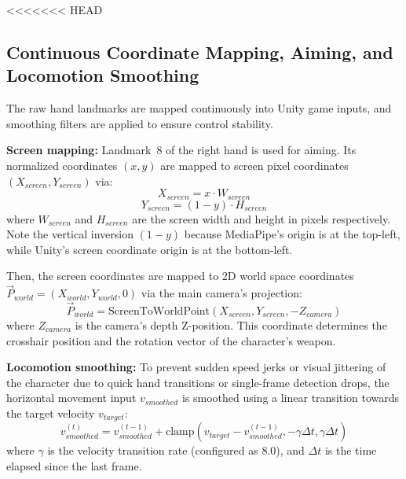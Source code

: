 \documentclass[journal,onecolumn,12pt,draftclsnofoot]{IEEEtran}
\begin{document}
<<<<<<< HEAD
\subsection{Continuous Coordinate Mapping, Aiming, and Locomotion Smoothing}
The raw hand landmarks are mapped continuously into Unity game inputs, and smoothing filters are applied to ensure control stability.

\textbf{Screen mapping:} Landmark~8 of the right hand is used for aiming. Its normalized coordinates $(x, y)$ are mapped to screen pixel coordinates $(X_{screen}, Y_{screen})$ via:
\begin{equation}
X_{screen}=x\cdot W_{screen}
\end{equation}
\begin{equation}
Y_{screen}=(1-y)\cdot H_{screen}
\end{equation}
where $W_{screen}$ and $H_{screen}$ are the screen width and height in pixels respectively. Note the vertical inversion $(1 - y)$ because MediaPipe's origin is at the top-left, while Unity's screen coordinate origin is at the bottom-left.

Then, the screen coordinates are mapped to 2D world space coordinates $\vec{P}_{world} = (X_{world}, Y_{world}, 0)$ via the main camera's projection:
\begin{equation}
\vec{P}_{world} = \text{ScreenToWorldPoint}(X_{screen}, Y_{screen}, -Z_{camera})
\label{eq:world_projection}
\end{equation}
where $Z_{camera}$ is the camera's depth Z-position. This coordinate determines the crosshair position and the rotation vector of the character's weapon.

\textbf{Locomotion smoothing:} To prevent sudden speed jerks or visual jittering of the character due to quick hand transitions or single-frame detection drops, the horizontal movement input $v_{smoothed}$ is smoothed using a linear transition towards the target velocity $v_{target}$:
\begin{equation}
v_{smoothed}^{(t)} = v_{smoothed}^{(t-1)} + \text{clamp}\left(v_{target} - v_{smoothed}^{(t-1)}, -\gamma \Delta t, \gamma \Delta t\right)
\label{eq:smoothing}
\end{equation}
where $\gamma$ is the velocity transition rate (configured as $8.0$), and $\Delta t$ is the time elapsed since the last frame.
\end{document}
